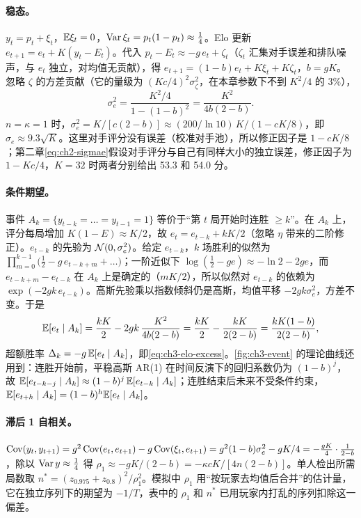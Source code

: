 \paragraph{稳态。} $y_t=p_t+\xi_t$，$\mathbb{E}\xi_t=0$，$\operatorname{Var}\xi_t=p_t(1-p_t)\approx\frac14$。Elo 更新 $e_{t+1}=e_t+K(y_t-E_t)$。代入 $p_t-E_t\approx-g\,e_t+\zeta_t$（$\zeta_t$ 汇集对手误差和排队噪声，与 $e_t$ 独立，对均值无贡献），得 $e_{t+1}=(1-b)e_t+K\xi_t+K\zeta_t$，$b=gK$。忽略 $\zeta$ 的方差贡献（它的量级为 $(Kc/4)^2\sigma_\zeta^2$，在本章参数下不到 $K^2/4$ 的 3\%），
\[
\sigma_e^2=\frac{K^2/4}{1-(1-b)^2}=\frac{K^2}{4b(2-b)} .
\]
$n=\kappa=1$ 时，$\sigma_e^2=K/[c(2-b)]\approx(200/\ln10)\,K/(1-cK/8)$，即 $\sigma_e\approx9.3\sqrt K$。这里对手评分没有误差（校准对手池），所以修正因子是 $1-cK/8$；第二章\cref{eq:ch2-sigmae}假设对手评分与自己有同样大小的独立误差，修正因子为 $1-Kc/4$，$K=32$ 时两者分别给出 53.3 和 54.0 分。

\paragraph{条件期望。} 事件 $A_k=\{y_{t-k}=\dots=y_{t-1}=1\}$ 等价于“第 $t$ 局开始时连胜 $\ge k$”。在 $A_k$ 上，评分每局增加 $K(1-E)\approx K/2$，故 $e_t=e_{t-k}+kK/2$（忽略 $\eta$ 带来的二阶修正）。$e_{t-k}$ 的先验为 $\mathcal{N}(0,\sigma_e^2)$。给定 $e_{t-k}$，$k$ 场胜利的似然为 $\prod_{m=0}^{k-1}\big(\frac12-g\,e_{t-k+m}+\dots\big)$；一阶近似下 $\log(\frac12-g e)\approx-\ln2-2g e$，而 $e_{t-k+m}-e_{t-k}$ 在 $A_k$ 上是确定的（$mK/2$），所以似然对 $e_{t-k}$ 的依赖为 $\exp(-2gk\,e_{t-k})$。高斯先验乘以指数倾斜仍是高斯，均值平移 $-2gk\sigma_e^2$，方差不变。于是
\[
\mathbb{E}[e_t\mid A_k]=\frac{kK}{2}-2gk\,\frac{K^2}{4b(2-b)}=\frac{kK}2-\frac{kK}{2(2-b)}=\frac{kK(1-b)}{2(2-b)},
\]
超额胜率 $\Delta_k=-g\,\mathbb{E}[e_t\mid A_k]$，即\cref{eq:ch3-elo-excess}。\cref{fig:ch3-event} 的理论曲线还用到：连胜开始前，平稳高斯 AR(1) 在时间反演下的回归系数仍为 $(1-b)^j$，故 $\mathbb{E}[e_{t-k-j}\mid A_k]\approx(1-b)^j\,\mathbb{E}[e_{t-k}\mid A_k]$；连胜结束后未来不受条件约束，$\mathbb{E}[e_{t+h}\mid A_k]=(1-b)^h\mathbb{E}[e_t\mid A_k]$。

\paragraph{滞后 1 自相关。} $\operatorname{Cov}(y_t,y_{t+1})=g^2\operatorname{Cov}(e_t,e_{t+1})-g\operatorname{Cov}(\xi_t,e_{t+1})=g^2(1-b)\sigma_e^2-gK/4=-\frac{gK}{4}\cdot\frac{1}{2-b}$，除以 $\operatorname{Var} y\approx\frac14$ 得 $\rho_1\approx-gK/(2-b)=-\kappa cK/[4n(2-b)]$。单人检出所需局数取 $n^*=(z_{0.975}+z_{0.8})^2/\rho_1^2$。模拟中 $\rho_1$ 用“按玩家去均值后合并”的估计量，它在独立序列下的期望为 $-1/T$，表中的 $\rho_1$ 和 $n^*$ 已用玩家内打乱的序列扣除这一偏差。

